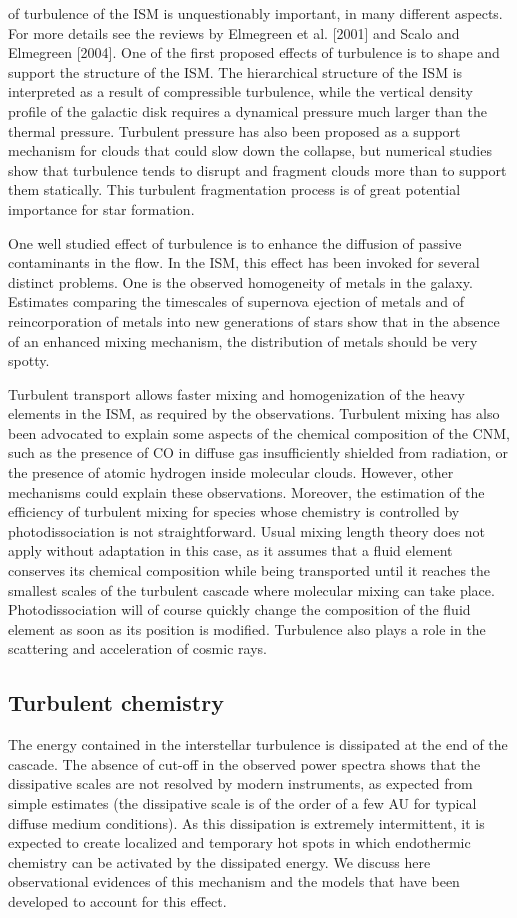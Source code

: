  of turbulence of the ISM is unquestionably important, in many different aspects.
For more details see the reviews by Elmegreen et al. [2001] and Scalo
and Elmegreen [2004].
One of the first proposed effects of turbulence is to shape and support
the structure of the ISM. The hierarchical structure of the ISM is interpreted
as a result of compressible turbulence, while the vertical density profile of
the galactic disk requires a dynamical pressure much larger than the thermal
pressure. Turbulent pressure has also been proposed as a support mechanism
for clouds that could slow down the collapse, but numerical studies show
that turbulence tends to disrupt and fragment clouds more than to support
them statically. This turbulent fragmentation process is of great potential
importance for star formation.

One well studied effect of turbulence is to enhance the diffusion of passive
contaminants in the flow. In the ISM, this effect has been invoked for several
distinct problems. One is the observed homogeneity of metals in the galaxy.
Estimates comparing the timescales of supernova ejection of metals and of
reincorporation of metals into new generations of stars show that in the absence of an enhanced mixing mechanism, the distribution of metals should
be very spotty. 

Turbulent transport allows faster mixing and homogenization
of the heavy elements in the ISM, as required by the observations.
Turbulent mixing has also been advocated to explain some aspects of the
chemical composition of the CNM, such as the presence of CO in diffuse gas
insufficiently shielded from radiation, or the presence of atomic hydrogen
inside molecular clouds. However, other mechanisms could explain these observations. Moreover, the estimation of the efficiency of turbulent mixing for
species whose chemistry is controlled by photodissociation is not straightforward. Usual mixing length theory does not apply without adaptation in this
case, as it assumes that a fluid element conserves its chemical composition
while being transported until it reaches the smallest scales of the turbulent
cascade where molecular mixing can take place. Photodissociation will of
course quickly change the composition of the fluid element as soon as its
position is modified. Turbulence also plays a role in the scattering and acceleration of cosmic rays. 

\subsection{Turbulent chemistry}
The energy contained in the interstellar turbulence is dissipated at the end of
the cascade. The absence of cut-off in the observed power spectra shows that
the dissipative scales are not resolved by modern instruments, as expected
from simple estimates (the dissipative scale is of the order of a few AU for
typical diffuse medium conditions). As this dissipation is extremely intermittent, it is expected to create localized and temporary hot spots in which endothermic chemistry
can be activated by the dissipated energy. We discuss here observational
evidences of this mechanism and the models that have been developed to
account for this effect.

